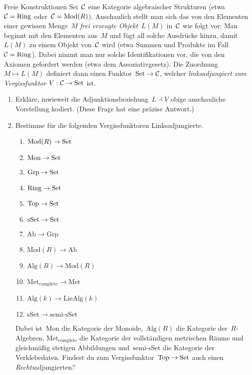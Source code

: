 \documentclass{uebblatt}
\begin{document}
\begin{aufgabe}{Freie Konstruktionen}
Sei~$\mathcal{C}$ eine Kategorie algebraischer Strukturen (etwa~$\mathcal{C} = \mathrm{Ring}$
oder~$\mathcal{C} = \mathrm{Mod}(R)$). Anschaulich stellt man sich das von den Elementen
einer gewissen Menge~$M$ \emph{frei erzeugte Objekt}~$L(M)$ in~$\mathcal{C}$ wie folgt
vor: Man beginnt mit den Elementen aus~$M$ und fügt all solche Ausdrücke hinzu,
damit~$L(M)$ zu einem Objekt von~$\mathcal{C}$ wird (etwa Summen und Produkte im Fall~$\mathcal{C}
= \mathrm{Ring}$). Dabei nimmt man nur solche Identifikationen vor, die von den
Axiomen gefordert werden (etwa dem Assoziativgesetz). Die Zuordnung~$M \mapsto
L(M)$ definiert dann einen Funktor~$\mathrm{Set} \to \mathcal{C}$, welcher \emph{linksadjungiert
zum Vergissfunktor} $V : \mathcal{C} \to \mathrm{Set}$ ist.

\begin{enumerate}
\item Erkläre, inwieweit die Adjunktionsbeziehung~$L \dashv V$ obige anschauliche
Vorstellung kodiert. (Diese Frage hat eine präzise Antwort.)
\item Bestimme für die folgenden Vergissfunktoren Linksadjungierte.
\begin{multicols}{2}
\renewcommand{\theenumii}{\arabic{enumii}}
\begin{enumerate}
\item $\mathrm{Mod}(R) \to \mathrm{Set}$
\item $\mathrm{Mon} \to \mathrm{Set}$
\item $\mathrm{Grp} \to \mathrm{Set}$
\item $\mathrm{Ring} \to \mathrm{Set}$
\item $\mathrm{Top} \to \mathrm{Set}$
\item $\mathrm{sSet} \to \mathrm{Set}$
\item $\mathrm{Ab} \to \mathrm{Grp}$
\item $\mathrm{Mod}(R) \to \mathrm{Ab}$
\item $\mathrm{Alg}(R) \to \mathrm{Mod}(R)$
\item $\mathrm{Met}_\mathrm{complete} \to \mathrm{Met}$
\item $\mathrm{Alg}(k) \to \mathrm{LieAlg}(k)$
\item $\mathrm{sSet} \to \text{semi-sSet}$
\end{enumerate}
\end{multicols}
Dabei ist~$\mathrm{Mon}$ die Kategorie der Monoide,~$\mathrm{Alg}(R)$ die Kategorie
der~$R$-Algebren, $\mathrm{Met}_\mathrm{complete}$ die Kategorie der
vollständigen metrischen
Räume und gleichmäßig stetigen Abbildungen und~$\text{semi-sSet}$ die
Kategorie der Verklebedaten. Findest du zum Vergissfunktor~$\mathrm{Top} \to
\mathrm{Set}$ auch einen \emph{Rechts}adjungierten?
\end{enumerate}
\end{aufgabe}
\end{document}
